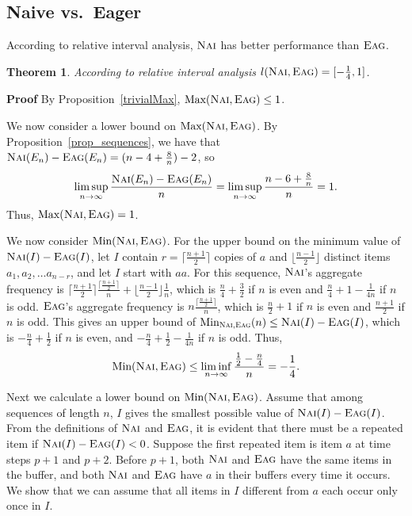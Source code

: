 \documentclass[11pt]{article}
\newtheorem{xtheorem}{Theorem}
\newenvironment{theorem}{\begin{xtheorem}\rm}{\end{xtheorem}}
\newenvironment{proof}{\begin{trivlist}\item[]{\bf Proof }}{\hspace*{\fill}\raisebox{-1pt}{\boldmath$\Box$}\end{trivlist}}
\newcommand{\nav}{{\ensuremath{\textsc{Nai}}}\xspace}
\newcommand{\eag}{{\ensuremath{\textsc{Eag}}}\xspace}
\DeclareMathOperator{\Max}{\textrm{Max}}
\DeclareMathOperator{\Min}{\textrm{Min}}
\begin{document}
\subsection{Naive vs.\ Eager}
According to relative interval analysis, \nav has better performance than \eag.
\begin{theorem}\label{thm:relint_nav_eag}
 According to relative interval analysis $l(\nav, \eag) = [-\frac{1}{4},1]$.
\end{theorem}
\begin{proof}
By Proposition~\ref{trivialMax}, $\Max(\nav, \eag)\leq 1$.

We now consider a lower bound on $\Max(\nav, \eag)$.
By Proposition~\ref{prop_sequences},
we have that
$ \nav (E_n) - \eag (E_n)  = (n-4+\frac{8}{n})-2$, so
\[
\limsup _{n\to \infty} \frac{\nav (E_n) - \eag (E_n)}{n}
= \limsup _{n\to \infty} \frac{n-6+\frac{8}{n}}{n} = 1.
\]
Thus, $\Max(\nav, \eag)= 1$.

We now consider $\Min(\nav, \eag)$.
For the upper bound on the minimum value of $\nav (I) - \eag (I)$,
let $I$ contain $r=\lceil \frac{n+1}{2} \rceil$ copies of $a$ and $\lfloor
\frac{n-1}{2}\rfloor$ distinct items
 $a_1, a_2, \ldots a_{n-r}$, and let $I$ start with $a a$.
For this sequence, \nav's aggregate frequency is
$\lceil \frac{n+1}{2}\rceil \frac{\lceil\frac{n+1}{2}\rceil }{n} + \lfloor
\frac{n-1}{2}\rfloor \frac{1}{n}$,
which is  $\frac{n}{4} + \frac{3}{2}$ if $n$ is even and
$\frac{n}{4} +1 -\frac{1}{4n}$ if $n$ is odd.
\eag's aggregate frequency is
$n \frac{\lceil\frac{n+1}{2} \rceil}{n}$, which is
$ \frac{n}{2} + 1$ if $n$ is even and $\frac{n+1}{2}$ if $n$ is odd.
This gives an upper bound of $\Min_{\nav,\eag}(n)\leq
\nav (I) - \eag (I)$, which is $-\frac{n}{4} +\frac{1}{2}$ if $n$
is even, and $-\frac{n}{4} +\frac{1}{2}-\frac{1}{4n}$ if $n$ is odd.
Thus,
\begin{equation}
\Min(\nav, \eag)\leq \liminf _{n\to \infty} \frac{\frac{1}{2} - \frac{n}{4}}{n} = -\frac{1}{4}. \nonumber
\end{equation}

Next we calculate a lower bound on $\Min(\nav, \eag)$.
Assume that among sequences of length $n$, $I$ gives the smallest
possible value of $\nav(I)-\eag(I)$.
From the definitions of \nav and \eag, it is evident that there must
be a repeated item if $\nav (I) - \eag (I) <0$.
Suppose the first repeated item is item $a$ at time steps $p+1$ and $p+2$.
Before $p+1$, both \nav and \eag have  the same items in the buffer,
and both \nav and \eag have $a$ in their buffers every time it occurs.
We show that we can assume that all items in $I$ different from
$a$ each occur only once in $I$.


\end{proof}
\end{document}
